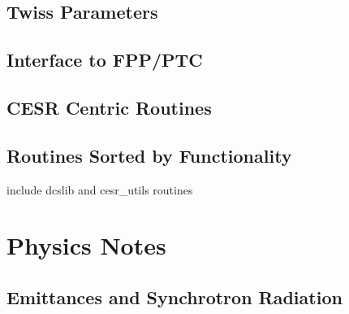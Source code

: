 \documentclass{book}
\begin{document}
\chapter{Twiss Parameters}

\chapter{Interface to FPP/PTC}

\chapter{CESR Centric Routines}

\chapter{Routines Sorted by Functionality}

include dcslib and cesr\_utils routines

\part{Physics Notes}

\chapter{Emittances and Synchrotron Radiation}



\begin{theindex}


\end{theindex}
\end{document}

